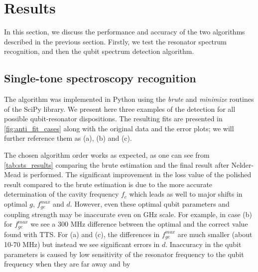 \documentclass[%
 aip,
 amsmath,amssymb,
 reprint,%
]{revtex4-1}
\begin{document}
\section{Results}

In this section, we discuss the performance and accuracy of the two algorithms described in the previous section. Firstly, we test the resonator spectrum recognition, and then the qubit spectrum detection algorithm.

\subsection{Single-tone spectroscopy recognition}

The algorithm was implemented in Python using the \textit{brute} and \textit{minimize} routines of the SciPy\cite{scipy} library. We present here three examples of the detection for all possible qubit-resonator dispositions.  The resulting fits are presented in \autoref{fig:anti_fit_cases} along with the original data and the error plots; we will further reference them as (a), (b) and (c). 

The chosen algorithm order works as expected, as one can see from \autoref{tab:sts_results} comparing the brute estimation and  the final result after Nelder-Mead is performed. 	The significant improvement in the loss value of the polished result compared to the brute estimation is due to the more accurate determination of the cavity frequency $f_c$ which leads as well to major shifts in optimal $g$, $f_{ge}^{max}$ and $d$. However, even these optimal qubit parameters and coupling strength may be inaccurate even on GHz scale. For example, in case (b) for $f_{ge}^{max}$ we see a 300 MHz difference between the optimal and the correct value found with TTS. For (a) and (c), the differences in $f_{ge}^{max}$ are much smaller (about 10-70 MHz) but instead we see significant errors in $d$. Inaccuracy in the qubit parameters is caused by low sensitivity of the resonator frequency to the qubit frequency when they are far away and by 
\end{document}
